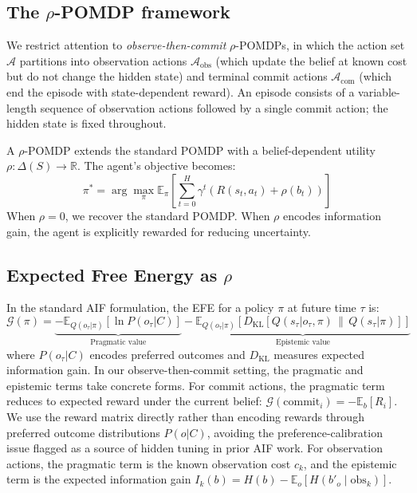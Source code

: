 \documentclass{article}
\begin{document}
\subsection{The $\rho$-POMDP framework}

We restrict attention to \emph{observe-then-commit} $\rho$-POMDPs, in which the action set $\mathcal{A}$ partitions into observation actions $\mathcal{A}_\text{obs}$ (which update the belief at known cost but do not change the hidden state) and terminal commit actions $\mathcal{A}_\text{com}$ (which end the episode with state-dependent reward). An episode consists of a variable-length sequence of observation actions followed by a single commit action; the hidden state is fixed throughout.

A $\rho$-POMDP extends the standard POMDP with a belief-dependent utility $\rho : \Delta(S) \rightarrow \mathbb{R}$. The agent's objective becomes:
\begin{equation}
    \pi^* = \arg\max_\pi \mathbb{E}_\pi \left[ \sum_{t=0}^{H} \gamma^t \left( R(s_t, a_t) + \rho(b_t) \right) \right]
\end{equation}
When $\rho = 0$, we recover the standard POMDP. When $\rho$ encodes information gain, the agent is explicitly rewarded for reducing uncertainty.

\subsection{Expected Free Energy as $\rho$}

In the standard AIF formulation, the EFE for a policy $\pi$ at future time $\tau$ is:
\begin{equation}
    \mathcal{G}(\pi) = \underbrace{- \mathbb{E}_{Q(o_\tau|\pi)}[\ln P(o_\tau|C)]}_{\text{Pragmatic value}} - \underbrace{\mathbb{E}_{Q(o_\tau|\pi)}\left[D_{\mathrm{KL}}\left[Q(s_\tau|o_\tau, \pi) \,\|\, Q(s_\tau|\pi)\right]\right]}_{\text{Epistemic value}}
\end{equation}
where $P(o_\tau|C)$ encodes preferred outcomes and $D_{\mathrm{KL}}$ measures expected information gain. In our observe-then-commit setting, the pragmatic and epistemic terms take concrete forms. For commit actions, the pragmatic term reduces to expected reward under the current belief: $\mathcal{G}(\text{commit}_i) = -\mathbb{E}_b[R_i]$. We use the reward matrix directly rather than encoding rewards through preferred outcome distributions $P(o|C)$, avoiding the preference-calibration issue flagged as a source of hidden tuning in prior AIF work. For observation actions, the pragmatic term is the known observation cost $c_k$, and the epistemic term is the expected information gain $I_k(b) = H(b) - \mathbb{E}_o[H(b'_o \mid \text{obs}_k)]$.
\end{document}
